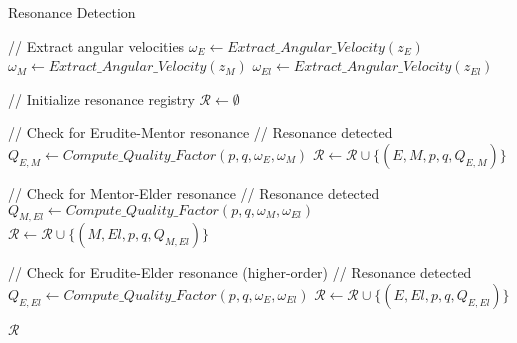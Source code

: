 \begin{algorithm}
\caption{Resonance Detection}
\begin{algorithmic}[1]
    \State // Extract angular velocities
    \State $\omega_E \gets Extract\_Angular\_Velocity(z_E)$
    \State $\omega_M \gets Extract\_Angular\_Velocity(z_M)$
    \State $\omega_{El} \gets Extract\_Angular\_Velocity(z_{El})$
    
    \State // Initialize resonance registry
    \State $\mathcal{R} \gets \emptyset$
    
    \State // Check for Erudite-Mentor resonance
                \State // Resonance detected
                \State $Q_{E,M} \gets Compute\_Quality\_Factor(p, q, \omega_E, \omega_M)$
                    \State $\mathcal{R} \gets \mathcal{R} \cup \{(E, M, p, q, Q_{E,M})\}$
                \EndIf
            \EndIf
        \EndFor
    \EndFor
    
    \State // Check for Mentor-Elder resonance
                \State // Resonance detected
                \State $Q_{M,El} \gets Compute\_Quality\_Factor(p, q, \omega_M, \omega_{El})$
                    \State $\mathcal{R} \gets \mathcal{R} \cup \{(M, El, p, q, Q_{M,El})\}$
                \EndIf
            \EndIf
        \EndFor
    \EndFor
    
    \State // Check for Erudite-Elder resonance (higher-order)
                \State // Resonance detected
                \State $Q_{E,El} \gets Compute\_Quality\_Factor(p, q, \omega_E, \omega_{El})$
                    \State $\mathcal{R} \gets \mathcal{R} \cup \{(E, El, p, q, Q_{E,El})\}$
                \EndIf
            \EndIf
        \EndFor
    \EndFor
    
    \State \Return $\mathcal{R}$
\EndFunction
\end{algorithmic}
\end{algorithm}

